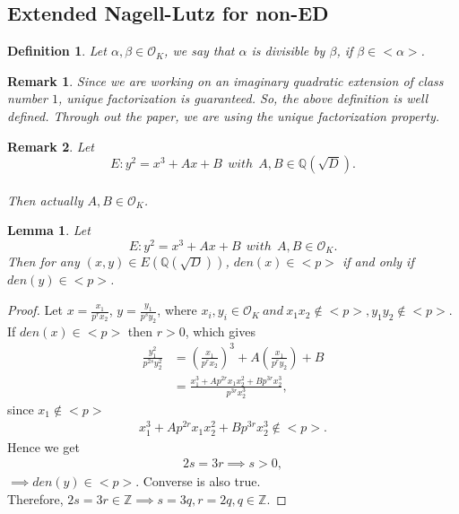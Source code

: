 \documentclass[12pt,leqno]{amsart}
\newcommand{\<}{\langle}
\renewcommand{\>}{\rangle}
\newtheorem*{definition}{Definition}
\newtheorem{lemma}{Lemma}
\newtheorem{rmk}{Remark}
\theoremstyle{definition}
\numberwithin{equation}{section}
\begin{document}
\subsection{Extended Nagell-Lutz for non-ED}
\begin{definition}
     Let $\alpha,\beta\in{\mathcal{O}_K}$, we say that $\alpha$ is divisible by $\beta$, if  $\beta\in <\alpha>$.
\end{definition}
\begin{rmk}
    Since we are working on an imaginary quadratic extension of class number $1$, unique factorization is guaranteed. So, the above definition is well defined. Through out the paper, we are using the unique factorization property. 
\end{rmk}
\begin{rmk}
    Let \begin{equation*}
         E:y^2=x^3+Ax+B ~~with~~ A,B\in \mathbb Q(\sqrt{D}).
     \end{equation*}\\
     Then actually $A, B\in{\mathcal{O}_K}$.
\end{rmk}
\begin{lemma}\label{lemma7}
Let
\begin{equation*}
         E:y^2=x^3+Ax+B ~~with~~ A,B\in {\mathcal{O}_K}.
\end{equation*}
Then for any $(x,y)\in E(\mathbb Q(\sqrt{D}))$, $den(x)\in<p>$ if and only if $den(y)\in <p>$.
\end{lemma}
\begin{proof}
     Let $x=\frac{x_1}{p^rx_2}$, $y=\frac{y_1}{p^sy_2}$, where $x_i,y_i\in{\mathcal{O}_K}~and~x_1x_2\notin <p>, y_1y_2\notin <p>$.\\
     If $den(x)\in<p>$ then $r>0$, which gives
     \begin{align*}
         \frac{y_1^2}{p^{2s}y_2^2}&=\left(\frac{x_1}{p^rx_2}\right)^3+A\left(\frac{x_1}{p^r y_2}\right)+B\\
         &=\frac{x_1^3+Ap^{2r}x_1x_2^2+Bp^{3r}x_2^3}{p^{3r}x_2^3},
     \end{align*}
     since $ x_1\notin <p>$\\
     \begin{align*}
         x_1^3+Ap^{2r}x_1x_2^2+Bp^{3r}x_2^3\notin<p>.
     \end{align*}
    Hence we get
    \begin{align*}
        2s=3r \implies s>0,
    \end{align*}
     $\implies den(y)\in<p> $. Converse is also true.\\
    Therefore, $2s=3r\in\mathbb Z\implies s=3q,r=2q,q\in \mathbb Z$.
\end{proof}
\end{document}

